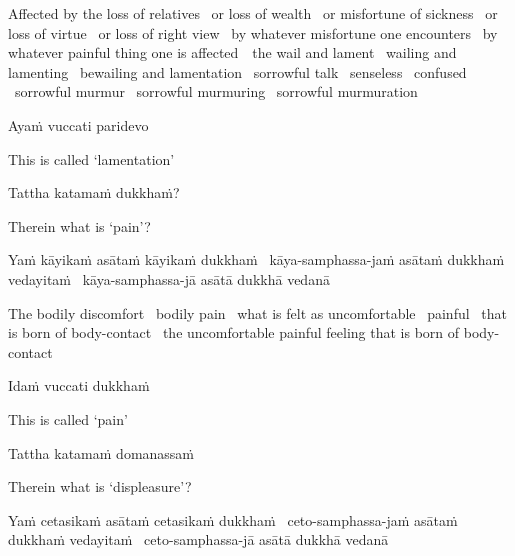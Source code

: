 \begin{english-hang-verses}
  Affected by the loss of relatives \breathmark\ or loss of wealth \breathmark\ or misfortune of sickness \breathmark\ or loss of virtue \breathmark\ or loss of right view \breathmark\ by whatever misfortune one encounters \breathmark\ by whatever painful thing one is \mbox{affected}~\breathmark\ the wail and lament \breathmark\ wailing and lamenting \breathmark\ bewailing and lamentation \breathmark\ sorrowful talk \breathmark\ senseless \breathmark\ confused \breathmark\ sorrowful murmur \breathmark\ sorrowful murmuring \breathmark\ sorrowful murmuration
\end{english-hang-verses}

Ayaṁ vuccati paridevo

\begin{english}
  This is called `lamentation'
\end{english}

Tattha katamaṁ dukkhaṁ?

\begin{english}
  Therein what is `pain'?
\end{english}

\begin{pali-hang}
  Yaṁ kāyikaṁ asātaṁ kāyikaṁ dukkhaṁ \breathmark\ kāya-samphassa-jaṁ asātaṁ dukkhaṁ vedayitaṁ \breathmark\ kāya-samphassa-jā asātā dukkhā vedanā
\end{pali-hang}

\begin{english-hang-verses}
  The bodily discomfort \breathmark\ bodily pain \breathmark\ what is felt as uncomfortable \breathmark\ painful \breathmark\ that is born of body-contact \breathmark\ the uncomfortable painful feeling that is born of body-contact
\end{english-hang-verses}

Idaṁ vuccati dukkhaṁ

\begin{english}
  This is called `pain'
\end{english}

Tattha katamaṁ domanassaṁ

\begin{english}
  Therein what is `displeasure'?
\end{english}

\begin{pali-hang}
  Yaṁ cetasikaṁ asātaṁ cetasikaṁ dukkhaṁ \breathmark\ ceto-samphassa-jaṁ asātaṁ dukkhaṁ vedayitaṁ \breathmark\ ceto-samphassa-jā asātā dukkhā vedanā
\end{pali-hang}


